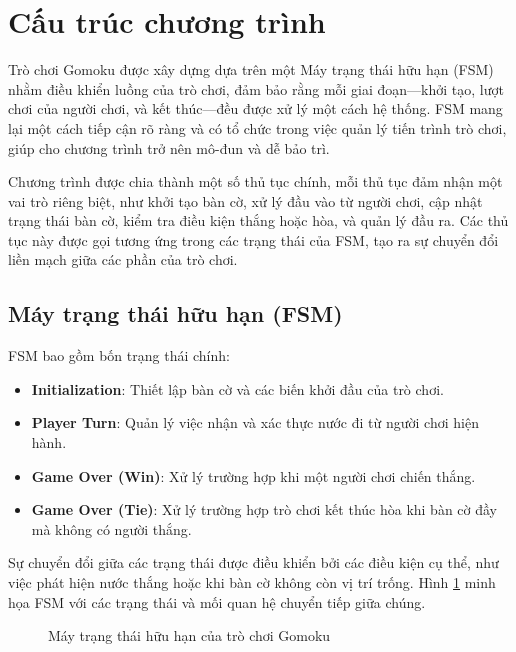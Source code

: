 \section{Cấu trúc chương trình}
Trò chơi Gomoku được xây dựng dựa trên một Máy trạng thái hữu hạn (FSM) nhằm điều khiển luồng của trò chơi, đảm bảo rằng mỗi giai đoạn—khởi tạo, lượt chơi của người chơi, và kết thúc—đều được xử lý một cách hệ thống. FSM mang lại một cách tiếp cận rõ ràng và có tổ chức trong việc quản lý tiến trình trò chơi, giúp cho chương trình trở nên mô-đun và dễ bảo trì.

Chương trình được chia thành một số thủ tục chính, mỗi thủ tục đảm nhận một vai trò riêng biệt, như khởi tạo bàn cờ, xử lý đầu vào từ người chơi, cập nhật trạng thái bàn cờ, kiểm tra điều kiện thắng hoặc hòa, và quản lý đầu ra. Các thủ tục này được gọi tương ứng trong các trạng thái của FSM, tạo ra sự chuyển đổi liền mạch giữa các phần của trò chơi.

\subsection{Máy trạng thái hữu hạn (FSM)}
FSM bao gồm bốn trạng thái chính:

\begin{itemize}
    \item \textbf{Initialization}: Thiết lập bàn cờ và các biến khởi đầu của trò chơi.
    \item \textbf{Player Turn}: Quản lý việc nhận và xác thực nước đi từ người chơi hiện hành.
    \item \textbf{Game Over (Win)}: Xử lý trường hợp khi một người chơi chiến thắng.
    \item \textbf{Game Over (Tie)}: Xử lý trường hợp trò chơi kết thúc hòa khi bàn cờ đầy mà không có người thắng.
\end{itemize}

Sự chuyển đổi giữa các trạng thái được điều khiển bởi các điều kiện cụ thể, như việc phát hiện nước thắng hoặc khi bàn cờ không còn vị trí trống. Hình \ref{fig:fsm} minh họa FSM với các trạng thái và mối quan hệ chuyển tiếp giữa chúng.

\begin{figure}[!htbp]
    \centering
    
    \caption{Máy trạng thái hữu hạn của trò chơi Gomoku}
    \label{fig:fsm}
\end{figure}

